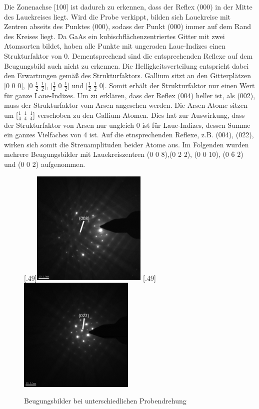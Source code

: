 \documentclass[a4paper,11pt,DIV=11]{scrartcl}
\begin{document}
Die Zonenachse [100] ist dadurch zu erkennen, dass der Reflex (000) in der Mitte des Lauekreises liegt. Wird die Probe verkippt, bilden sich Lauekreise mit Zentren abseits des Punktes (000), sodass der Punkt (000) immer auf dem Rand des Kreises liegt. Da GaAs ein kubischflächenzentriertes Gitter mit zwei Atomsorten bildet, haben alle Punkte mit ungeraden Laue-Indizes einen Strukturfaktor von 0. Dementsprechend sind die entsprechenden Reflexe auf dem Beugungsbild auch nicht zu erkennen. Die Helligkeitsverteilung entspricht dabei den Erwartungen gemäß des Strukturfaktors. Gallium sitzt an den Gitterplätzen [0 0 0], [0 $\frac{1}{2}$ $\frac{1}{2}$], [$\frac{1}{2}$ 0 $\frac{1}{2}$] und [$\frac{1}{2}$ $\frac{1}{2}$ 0]. Somit erhält der Strukturfaktor nur einen Wert für ganze Laue-Indizes. Um zu erklären, dass der Reflex (004) heller ist, als (002), muss der Strukturfaktor vom Arsen angesehen werden. Die Arsen-Atome sitzen um [$\frac{1}{4}$ $\frac{1}{4}$ $\frac{1}{4}$] verschoben zu den Gallium-Atomen. Dies hat zur Auswirkung, dass der Strukturfaktor von Arsen nur ungleich 0 ist für Laue-Indizes, dessen Summe ein ganzes Vielfaches von 4 ist. Auf die etnsprechenden Reflexe, z.B. (004), (022), wirken sich somit die Streuamplituden beider Atome aus.
Im Folgenden wurden mehrere Beugungsbilder mit Lauekreiszentren (0 0 8),(0 2 2), (0 0 10), (0 $\bar{6}$ $\bar{2}$) und (0 0 2) aufgenommen.

\begin{figure}[htb]\centering
	[.49\linewidth]{\includegraphics[width=0.49\textwidth]{Versuchsdaten/9/008.jpg}}
	[.49\linewidth]{\includegraphics[width=0.49\textwidth]{Versuchsdaten/9/022.jpg}}\\
	\caption{Beugungsbilder bei unterschiedlichen Probendrehung} \label{laue1}
\end{figure}
\end{document}
